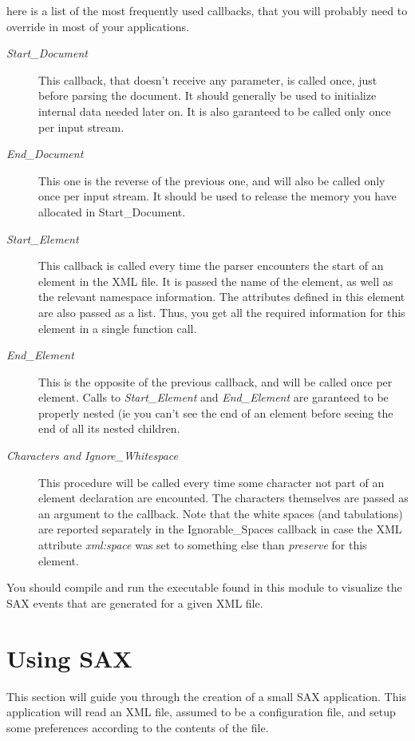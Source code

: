 \documentclass[letterpaper,10pt,english]{sphinxmanual}
\begin{document}
here is a list of the most frequently used callbacks, that you will probably
need to override in most of your applications.
\begin{description}
\item[{\emph{Start\_Document}}] \leavevmode
This callback, that doesn't receive any parameter, is called once, just
before parsing the document. It should generally be used to initialize
internal data needed later on. It is also garanteed to be called only once
per input stream.

\item[{\emph{End\_Document}}] \leavevmode
This one is the reverse of the previous one, and will also be called only
once per input stream. It should be used to release the memory you have
allocated in Start\_Document.

\item[{\emph{Start\_Element}}] \leavevmode
This callback is called every time the parser encounters the start of an
element in the XML file. It is passed the name of the element, as well as
the relevant namespace information. The attributes defined in this element
are also passed as a list. Thus, you get all the required information for
this element in a single function call.

\item[{\emph{End\_Element}}] \leavevmode
This is the opposite of the previous callback, and will be called once per
element. Calls to \emph{Start\_Element} and \emph{End\_Element} are garanteed
to be properly nested (ie you can't see the end of an element before seeing
the end of all its nested children.

\item[{\emph{Characters and Ignore\_Whitespace}}] \leavevmode
This procedure will be called every time some character not part of an
element declaration are encounted. The characters themselves are passed as an
argument to the callback. Note that the white spaces (and tabulations) are
reported separately in the Ignorable\_Spaces callback in case the XML
attribute \emph{xml:space} was set to something else than \emph{preserve} for this
element.

\end{description}

You should compile and run the  executable found in this
module to visualize the SAX events that are generated for a given XML file.


\section{Using SAX}
\label{sax:using-sax}\label{sax:id2}
This section will guide you through the creation of a small SAX application.
This application will read an XML file, assumed to be a configuration file, and
setup some preferences according to the contents of the file.
\end{document}
